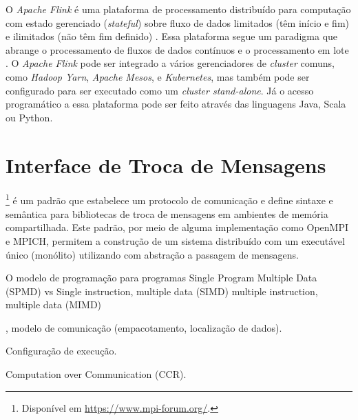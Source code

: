 O \emph{Apache Flink} é uma plataforma de processamento distribuído para
computação com estado gerenciado (\emph{stateful}) sobre fluxo de dados limitados (têm início e
fim) e ilimitados (não têm fim definido) \cite{ApacheFlink2020}.
Essa plataforma segue um paradigma que abrange o processamento de fluxos de
dados contínuos e o processamento em lote \cite{Carbone2015,Lopez2018}.
O \emph{Apache Flink} pode ser integrado a vários gerenciadores de \emph{cluster}
comuns, como \emph{Hadoop Yarn}, \emph{Apache Mesos}, e \emph{Kubernetes}, mas também pode ser
configurado para ser executado como um \emph{cluster stand-alone}.
Já o acesso programático a essa plataforma pode ser feito através das linguagens
Java, Scala ou Python.

\section{Interface de Troca de Mensagens}

\mpi\footnote{Disponível em \url{https://www.mpi-forum.org/}.} é um padrão que
estabelece um protocolo de comunicação e define sintaxe e semântica para
bibliotecas de troca de mensagens em ambientes de memória compartilhada.
Este padrão, por meio de alguma implementação como OpenMPI e MPICH,
permitem a construção de um sistema distribuído com um executável único
(monólito) utilizando com abstração a passagem de mensagens.

O modelo de programação para programas \mpi
Single Program Multiple Data (SPMD)
vs
Single instruction, multiple data (SIMD) 
multiple instruction, multiple data (MIMD) 

, modelo de comunicação (empacotamento,
localização de dados).

Configuração de execução.

Computation over Communication (CCR).
